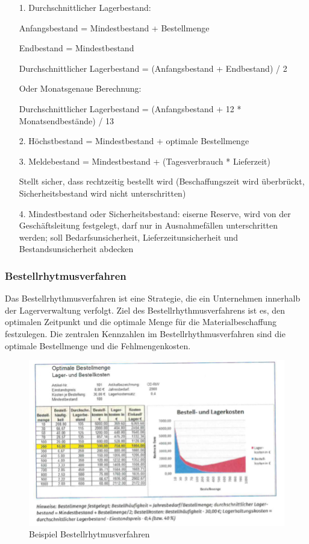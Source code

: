 \documentclass[10pt]{article}
\begin{document}
\begin{itemize}
 \item[1.]Durchschnittlicher Lagerbestand:
 \item[]Anfangsbestand = Mindestbestand + Bestellmenge
 \item[]Endbestand = Mindestbestand
 \item[]Durchschnittlicher Lagerbestand = (Anfangsbestand + Endbestand) / 2
\item[]Oder Monatsgenaue Berechnung: 
\item[]Durchschnittlicher Lagerbestand = (Anfangsbestand + 12 * Monatsendbestände) / 13

 \item[2.]	Höchstbestand = Mindestbestand + optimale Bestellmenge
 \item[3.]	Meldebestand = Mindestbestand + (Tagesverbrauch * Lieferzeit)                 \item[]Stellt sicher, dass rechtzeitig bestellt wird (Beschaffungszeit wird überbrückt, Sicherheitsbestand wird nicht unterschritten)
 \item[4.]	Mindestbestand oder Sicherheitsbestand: eiserne Reserve, wird von der Geschäftsleitung festgelegt, darf nur in Ausnahmefällen unterschritten werden; soll Bedarfsunsicherheit, Lieferzeitunsicherheit und Bestandsunsicherheit abdecken

\end{itemize}

\subsubsection{Bestellrhytmusverfahren}
Das Bestellrhythmusverfahren ist eine Strategie, die ein Unternehmen innerhalb der Lagerverwaltung verfolgt. Ziel des Bestellrhythmusverfahrens ist es, den optimalen Zeitpunkt und die optimale Menge für die Materialbeschaffung festzulegen. Die zentralen Kennzahlen im Bestellrhythmusverfahren sind die optimale Bestellmenge und die Fehlmengenkosten.

\begin{figure}[H]
\begin{center}
    \includegraphics[width=12cm]{Bestellrhymusverfahren.png}
    \end{center}
    \caption{Beispiel Bestellrhytmusverfahren}
    \label{fig:my_label}
\end{figure}
\end{document}
